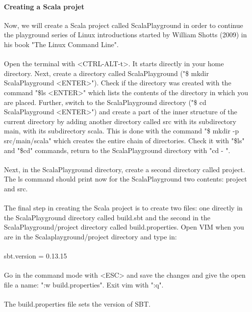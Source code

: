 \documentclass {article}
\begin{document}
\paragraph{Creating a Scala projet}

Now, we will create a Scala project called Scala\underline{\space}Playground in order to continue the playground series of Linux introductions started by William Shotts (2009) in his book "The Linux Command Line". 
\\
\\
Open the terminal with <CTRL-ALT-t>. 
It starts directly in your home directory.
 Next, create a directory called Scala\underline{\space}Playground ("\$ mkdir Scala\underline{\space}Playground <ENTER>"). Check if the directory was created with the command "\$ls <ENTER>" which lists the contents of the directory in which you are placed.
 Further, switch to the Scala\underline{\space}Playground directory ("\$ cd Scala\underline{\space}Playground <ENTER>") and create a part of the inner structure of the current directory by adding another directory called src with its subdirectory main, with its subdirectory scala.
 This is done with the command "\$ mkdir -p src/main/scala" which creates the entire chain of directories. Check it with "\$ls" and "\$cd" commands, return to the Scala\underline{\space}Playground directory with "cd - ". 
\\
\\
Next, in the Scala\underline{\space}Playground directory, create a second directory called project.
 The ls command should print now for the Scala\underline{\space}Playground two contents: project and src.  
\\
\\
The final step in creating the Scala project is to create two files: one directly in the Scala\underline{\space}Playground directory called build.sbt and the second in the Scala\underline{\space}Playground/project directory called build.properties. 
Open VIM when you are in the Scala\underline{\space}playground/project directory and type in:
\\
\\
sbt.version = 0.13.15 
\\
\\
Go in the command mode with <ESC> and save the changes and give the open file a name: ":w build.properties".
 Exit vim with ":q". 
\\
\\
The build.properties file sets the version of SBT.
\\
\end{document}
